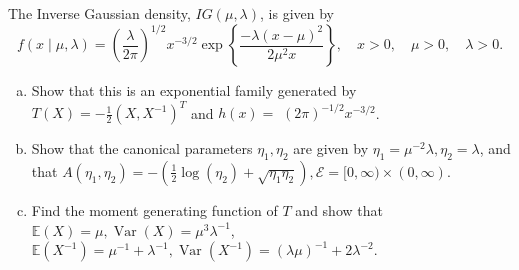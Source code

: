 \begin{exercise}
    The Inverse Gaussian density, \(I G(\mu, \lambda)\), is given by
    \[
        f(x \mid \mu, \lambda)=\left(\frac{\lambda}{2 \pi}\right)^{1 / 2} x^{-3 / 2} \exp \left\{\frac{-\lambda(x-\mu)^{2}}{2 \mu^{2} x}\right\}, \quad x>0, \quad \mu>0, \quad \lambda>0. 
    \]
    \begin{enumerate}[(a)]
        \item Show that this is an exponential family generated by \(T(X)=-\frac{1}{2}\left(X, X^{-1}\right)^{T}\) and \(h(x)=\) \((2 \pi)^{-1 / 2} x^{-3 / 2}\). 
        \item Show that the canonical parameters \(\eta_{1}, \eta_{2}\) are given by \(\eta_{1}=\mu^{-2} \lambda, \eta_{2}=\lambda\), and that \(A\left(\eta_{1}, \eta_{2}\right)=-\left(\frac{1}{2} \log \left(\eta_{2}\right)+\sqrt{\eta_{1} \eta_{2}}\right), \mathcal{E}=[0, \infty) \times(0, \infty)\). 
        \item Find the moment generating function of \(T\) and show that \(\mathbb{E}(X)=\mu, \operatorname{Var}(X)=\mu^{3} \lambda^{-1}\), \(\mathbb{E}\left(X^{-1}\right)=\mu^{-1}+\lambda^{-1}, \operatorname{Var}\left(X^{-1}\right)=(\lambda \mu)^{-1}+2 \lambda^{-2} .\)
    \end{enumerate}
\end{exercise}

